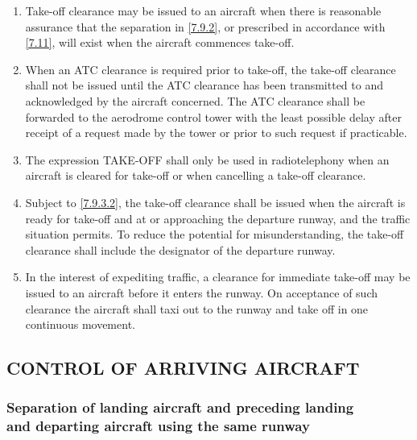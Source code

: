 \documentclass[../vATM.tex]{subfiles}
\begin{document}
    \begin{enumerate}
        \item Take-off clearance may be issued to an aircraft when there is reasonable assurance that the separation in \ref{7.9.2}, or prescribed in accordance with \ref{7.11}, will exist when the aircraft commences take-off.
        \item \label{7.9.3.2} When an ATC clearance is required prior to take-off, the take-off clearance shall not be issued until the ATC clearance has been transmitted to and acknowledged by the aircraft concerned. The ATC clearance shall be forwarded to the aerodrome control tower with the least possible delay after receipt of a request made by the tower or prior to such request if practicable.
        \item The expression TAKE-OFF shall only be used in radiotelephony when an aircraft is cleared for take-off or when cancelling a take-off clearance.


        \item Subject to \ref{7.9.3.2}, the take-off clearance shall be issued when the aircraft is ready for take-off and at or approaching the departure runway, and the traffic situation permits. To reduce the potential for misunderstanding, the take-off clearance shall include the designator of the departure runway.
        \item In the interest of expediting traffic, a clearance for immediate take-off may be issued to an aircraft before it enters the runway. On acceptance of such clearance the aircraft shall taxi out to the runway and take off in one continuous movement.
    \end{enumerate}

    \subsection[Control of arriving aircraft]{CONTROL OF ARRIVING AIRCRAFT}

    \subsubsection[Separation of landing aircraft and preceding landing and departing aircraft using the same runway]{Separation of landing aircraft and preceding landing \\ and departing aircraft using the same runway} \label{7.10.1}
\end{document}
